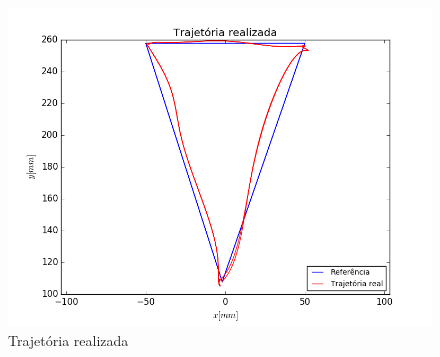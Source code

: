 \documentclass[]{politex}
\begin{document}
\begin{figure}[H]
	\centering
	\includegraphics[scale=0.39]{../../../Experimental/Aquisicoes/PIDt_triangulo/xy.png}  
	\caption{Trajetória realizada}
	\label{fig:PIDq_triangulo_xy}
\end{figure}
\end{document}
